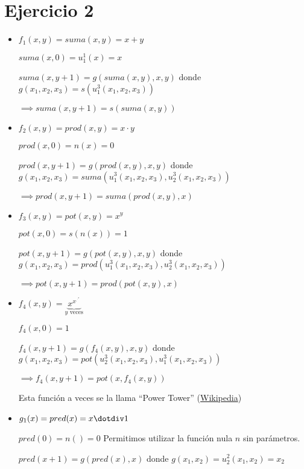 \section*{Ejercicio 2}

\begin{itemize}
    \item
    $f_1(x, y) = suma(x, y) = x + y$

    $suma(x, 0) = u^1_1(x) = x$

    $suma(x, y + 1) = g(suma(x, y), x, y)$ donde $g(x_1, x_2, x_3) = s(u^3_1(x_1, x_2, x_3))$

    $\implies suma(x, y + 1) = s(suma(x, y))$

    \item
    $f_2(x, y) = prod(x, y) = x \cdot y$

    $prod(x, 0) = n(x) = 0$

    $prod(x, y + 1) = g(prod(x, y), x, y)$ donde $g(x_1, x_2, x_3) = suma(u^3_1(x_1, x_2, x_3), u^3_2(x_1, x_2, x_3))$

    $\implies prod(x, y + 1) = suma(prod(x, y), x)$

    \item
    $f_3(x, y) = pot(x, y) = x^y$

    $pot(x, 0) = s(n(x)) = 1$

    $pot(x, y + 1) = g(pot(x, y), x, y)$ donde $g(x_1, x_2, x_3) = prod(u^3_1(x_1, x_2, x_3), u^3_2(x_1, x_2, x_3))$

    $\implies pot(x, y + 1) = prod(pot(x, y), x)$

    \item
    $f_4(x, y) = \underbrace{x^{x^{.^{.^{x}}}}}_{\text{$y$ veces}}$

    $f_4(x, 0) = 1$

    $f_4(x, y + 1) = g(f_4(x, y), x, y)$ donde $g(x_1, x_2, x_3) = pot(u^3_2(x_1, x_2, x_3), u^3_1(x_1, x_2, x_3))$

    $\implies f_4(x, y + 1) = pot(x,  f_4(x, y))$

    Esta función a veces se la llama ``Power Tower'' (\href{https://en.wikipedia.org/wiki/Tetration#Terminology}{Wikipedia})

    \item
    $g_1(x) = pred(x) = x \dotdiv 1$

    $pred(0) = n() = 0$ Permitimos utilizar la función nula $n$ sin parámetros.

    $pred(x + 1) = g(pred(x), x)$ donde $g(x_1, x_2) = u^2_2(x_1, x_2) = x_2$


\end{itemize}
